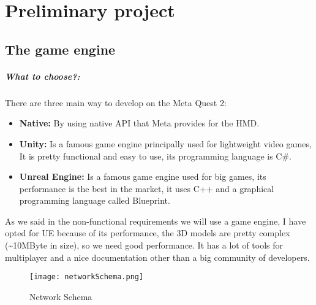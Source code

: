 
\chapter{Preliminary project}

\section{The game engine}

\paragraph{What to choose?:} 
There are three main way to develop on the Meta Quest 2:

\begin{itemize}
  \item \textbf{Native:} By using native \ac{API} that Meta provides for the \ac{HMD}.
  \item \textbf{Unity:} Is a famous game engine principally used for lightweight video games, It is pretty functional and easy to use, its programming language is C\#.
  \item \textbf{Unreal Engine:} Is a famous game engine used for big games, its performance is the best in the market, it uses C++ and a graphical programming language called Blueprint.
\end{itemize}
\noindent
As we said in the non-functional requirements we will use a game engine, I have opted for \ac{UE} because of its performance, the 3D models are pretty complex (\textasciitilde10MByte in size),
so we need good performance.
It has a lot of tools for multiplayer and a nice documentation other than a big community of developers.

\begin{figure}[h]
  \centering
  \texttt{[image: networkSchema.png]}
  \caption{Network Schema}
  \label{fig:NetworkSchema}
\end{figure}